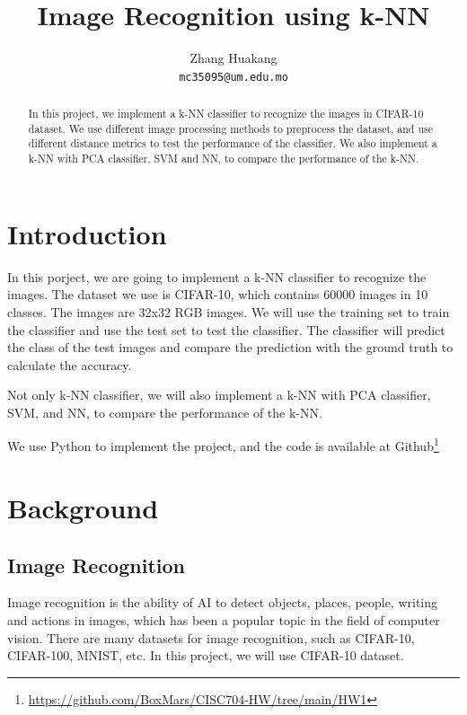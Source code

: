 \documentclass[11pt]{article}
\title{Image Recognition using k-NN}
\author{Zhang Huakang \\
  \texttt{mc35095@um.edu.mo} \\}
\begin{document}
\maketitle
\begin{abstract}
  In this project, we implement a k-NN classifier to recognize the images in CIFAR-10 dataset. We use different image processing methods to preprocess the dataset, and use different distance metrics to test the performance of the classifier. We also implement a k-NN with PCA classifier, SVM and NN, to compare the performance of the k-NN.
\end{abstract}

\section{Introduction}
In this porject, we are going to implement a k-NN classifier to recognize the images. 
The dataset we use is CIFAR-10, which contains 60000 images in 10 classes. 
The images are 32x32 RGB images. We will use the training set to train the classifier and use the test set to test the classifier. 
The classifier will predict the class of the test images and compare the prediction with the ground truth to calculate the accuracy. 

Not only k-NN classifier, we will also implement a k-NN with PCA classifier, SVM, and NN, to compare the performance of the k-NN.

We use Python to implement the project, and the code is available at Github\footnote{\url{https://github.com/BoxMars/CISC704-HW/tree/main/HW1}}

\section{Background}
\subsection{Image Recognition}
Image recognition is the ability of AI to detect objects, places, people, writing and actions in images, which has been a popular topic in the field of computer vision. There are many datasets for image recognition, such as CIFAR-10, CIFAR-100, MNIST, etc. In this project, we will use CIFAR-10 dataset.
\end{document}
